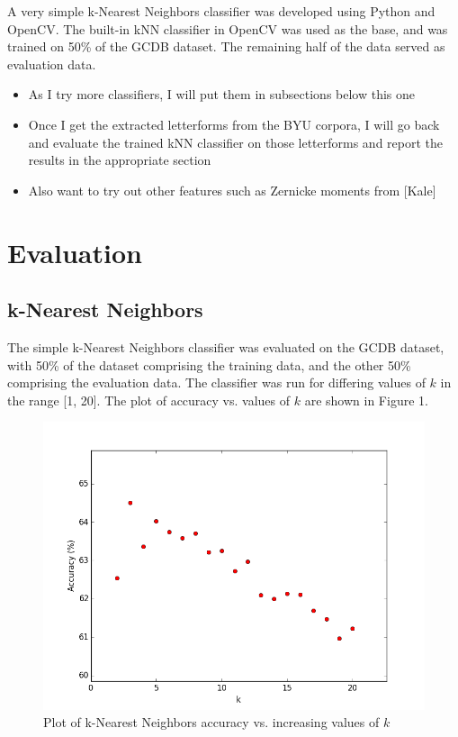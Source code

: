 \documentclass[10pt,twocolumn,letterpaper]{article}
\begin{document}
A very simple k-Nearest Neighbors classifier was developed using Python and OpenCV. The built-in kNN classifier in OpenCV was used as the base, and was trained on 50\% of the GCDB dataset. The remaining half of the data served as evaluation data.
\begin{itemize}
    \item As I try more classifiers, I will put them in subsections below this one
    \item Once I get the extracted letterforms from the BYU corpora, I will go back and evaluate the trained kNN classifier on those letterforms and report the results in the appropriate section
    \item Also want to try out other features such as Zernicke moments from [Kale]
\end{itemize}

\section{Evaluation}
\subsection{k-Nearest Neighbors}

The simple k-Nearest Neighbors classifier was evaluated on the GCDB dataset, with 50\% of the dataset comprising the training data, and the other 50\% comprising the evaluation data. The classifier was run for differing values of $k$ in the range [1, 20]. The plot of accuracy vs. values of $k$ are shown in Figure 1.

\begin{figure}
    \begin{center}
        \includegraphics[width=0.8\linewidth]{res/figure_1.png}
        \caption{Plot of k-Nearest Neighbors accuracy vs. increasing values of $k$}
    \end{center}
\end{figure}
\end{document}
